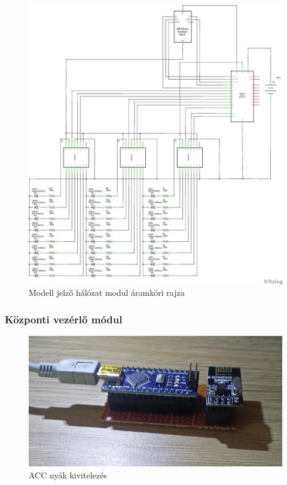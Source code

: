\documentclass[a4paper,12pt]{article}
\begin{document}
\begin{figure}[!htp]
	\includegraphics[width=\linewidth]{images/circuit_signal_module.png}
    \caption[Modell jelző hálózat modul áramköri rajza]{Modell jelző hálózat modul áramköri rajza}
	\label{fig:circuit_signal_module}
\end{figure}



\subsubsection{Központi vezérlő módul}

\begin{figure}
	\vspace{-20pt}
    \centering
    \includegraphics[scale=0.5]{images/ACCRFT.png}
    \caption[ACC implementáció]{ACC nyák kivitelezés}
    \label{fig:ACCRFT}
\end{figure}
\end{document}
